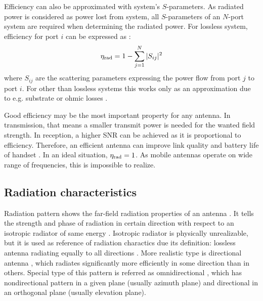 Efficiency can also be approximated with system's $S$-parameters. As radiated power is considered as power lost from system, all $S$-parameters of an $N$-port system are required when determining the radiated power. For lossless system, efficiency for port $i$ can be expressed as \cite{lehtovuori_phd}:
\begin{equation}
\label{eq:eff_aprx}
    {\eta}_{\mathrm{rad}} = 1-\sum_{j=1}^{N}|S_{ij}|^2
\end{equation}
where $S_{ij}$ are the scattering parameters expressing the power flow from port $j$ to port $i$. For other than lossless systems this works only as an approximation due to e.g. substrate or ohmic losses \cite{lehtovuori_phd}.

Good efficiency may be the most important property for any antenna. In transmission, that means a smaller transmit power is needed for the wanted field strength. In reception, a higher SNR can be achieved as it is proportional to efficiency. Therefore, an efficient antenna can improve link quality and battery life of handset \cite{molisch}. In an ideal situation, ${\eta}_{\mathrm{rad}}=1$. As mobile antennas operate on wide range of frequencies, this is impossible to realize. %


\subsection{Radiation characteristics}
\label{sec:pattern}
Radiation pattern shows the far-field radiation properties of an antenna \cite{balanis, stutzman}. It tells the strength and phase of radiation in certain direction with respect to an isotropic radiator of same energy \cite{balanis}. Isotropic radiator is physically unrealizable, but it is used as reference of radiation charactics due its definition: lossless antenna radiating equally to all directions \cite{balanis}. More realistic type is directional antenna \cite{balanis}, which radiates significantly more efficiently in some direction than in others. Special type of this pattern is referred as omnidirectional \cite{balanis}, which has nondirectional pattern in a given plane (usually azimuth plane) and directional in an orthogonal plane (usually elevation plane).

